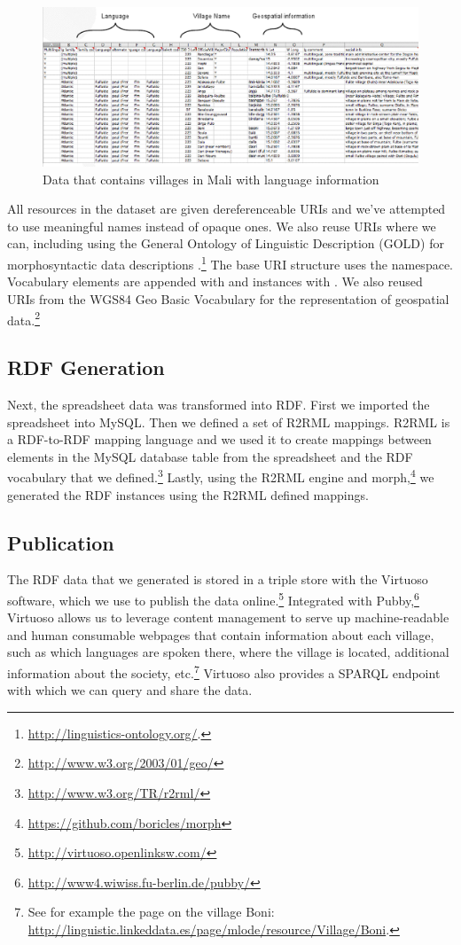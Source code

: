\begin{figure}[b!hpt]
\caption{Data that contains villages in Mali with language information}\label{spreadsheet}
\includegraphics[width=15cm]{img/spreadsheet.png}
\end{figure}

All resources in the dataset are given dereferenceable URIs and we've attempted to use meaningful names instead of opaque ones. We also reuse URIs where we can, including using the General Ontology of Linguistic Description (GOLD) for morphosyntactic data descriptions \cite{farrar2003linguistic}.\footnote{ \url{http://linguistics-ontology.org/}.} The base URI structure uses the  namespace. Vocabulary elements are appended with  and instances with . We also reused URIs from the WGS84 Geo Basic Vocabulary for the representation of geospatial data.\footnote{\url{http://www.w3.org/2003/01/geo/}} 

\subsection{RDF Generation}
Next, the spreadsheet data was transformed into RDF. First we imported the spreadsheet into MySQL. Then we defined a set of R2RML mappings. R2RML is a RDF-to-RDF mapping language and we used it to create mappings between elements in the MySQL database table from the spreadsheet and the RDF vocabulary that we defined.\footnote{\url{http://www.w3.org/TR/r2rml/}} Lastly, using the R2RML engine and morph,\footnote{\url{https://github.com/boricles/morph}} we generated the RDF instances using the R2RML defined mappings.

\subsection{Publication}\label{sec:pub}
The RDF data that we generated is stored in a triple store with the Virtuoso software, which we use to publish the data online.\footnote{\url{http://virtuoso.openlinksw.com/}} Integrated with Pubby,\footnote{\url{http://www4.wiwiss.fu-berlin.de/pubby/}} Virtuoso allows us to leverage content management to serve up machine-readable and human consumable webpages that contain information about each village, such as which languages are spoken there, where the village is located, additional information about the society, etc.\footnote{See for example the page on the village Boni: \url{http://linguistic.linkeddata.es/page/mlode/resource/Village/Boni}.} Virtuoso also provides a SPARQL endpoint with which we can query and share the data.

